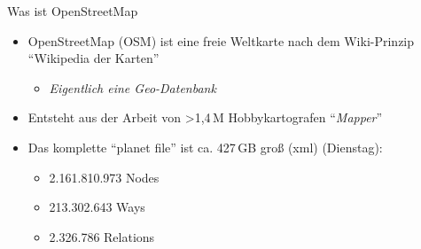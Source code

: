 \documentclass[handout]{beamer}
\begin{document}
\begin{frame}{Was ist OpenStreetMap}

\begin{itemize}
  \item OpenStreetMap (OSM) ist eine freie Weltkarte nach dem Wiki-Prinzip "`Wikipedia der Karten"'
    \begin{itemize}
      \item \emph{Eigentlich eine Geo-Datenbank}
    \end{itemize}
\pause
  \item Entsteht aus der Arbeit von \textgreater 1,4\,M Hobbykartografen "`\emph{Mapper}"'

 \item Das komplette "`planet file"' ist ca. 427\,GB groß (xml) (Dienstag):
  \begin{itemize}
    \item 2.161.810.973 Nodes
    \item 213.302.643 Ways
    \item 2.326.786 Relations
  \end{itemize}

\end{itemize}



\end{frame}
\end{document}
